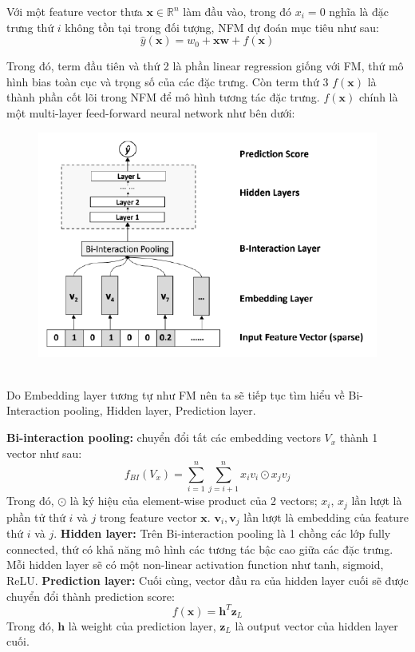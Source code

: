 \indent Với một feature vector thưa $\mathbf{x} \in \mathbb{R}^{n}$ làm đầu vào, trong đó $x_i = 0$ nghĩa là đặc trưng thứ $i$ không tồn tại trong đối tượng, 
NFM dự đoán mục tiêu như sau:
$$ \hat{y}(\mathbf{x}) = w_0 + \mathbf{xw} + f(\mathbf{x})$$

Trong đó, term đầu tiên và thứ 2 là phần linear regression giống với FM, 
thứ mô hình bias toàn cục và trọng số của các đặc trưng. Còn term thứ 3 $f(\mathbf{x})$ là thành phần cốt lõi trong NFM 
để mô hình tương tác đặc trưng. $f(\mathbf{x})$ chính là một multi-layer feed-forward neural network như bên dưới:
\begin{figure}[h]
    \centering
    \includegraphics[width=0.7\linewidth]{figures/63.png}
\end{figure}\\
Do Embedding layer tương tự như FM nên ta sẽ tiếp tục tìm hiểu về Bi-Interaction pooling, Hidden layer, Prediction layer.

\textbf{Bi-interaction pooling:} chuyển đổi tất các embedding vectors $V_x$ thành 1 vector như sau:
$$ f_{BI}(V_x) = \sum_{i=1}^{n} \sum_{j=i+1}^{n} x_i v_i \odot x_j v_j $$
Trong đó, $\odot$ là ký hiệu của element-wise product của 2 vectors; $x_i$, $x_j$ lần lượt 
là phần tử thứ $i$ và $j$ trong feature vector $\mathbf{x}$. $\mathbf{v}_i, \mathbf{v}_j$ lần lượt là embedding của feature thứ $i$ và $j$.
\textbf{Hidden layer:} Trên Bi-interaction pooling là 1 chồng các lớp fully connected, thứ có khả năng mô hình các tương tác bậc cao giữa các đặc trưng. 
Mỗi hidden layer sẽ có một non-linear activation function như tanh, sigmoid, ReLU.
\textbf{Prediction layer:} Cuối cùng, vector đầu ra của hidden layer cuối sẽ được chuyển đổi thành prediction score:
$$f(\mathbf{x}) = \mathbf{h}^T \mathbf{z}_L$$
Trong đó, $\mathbf{h}$ là weight của prediction layer, $\mathbf{z}_L$ là output vector của hidden layer cuối.
